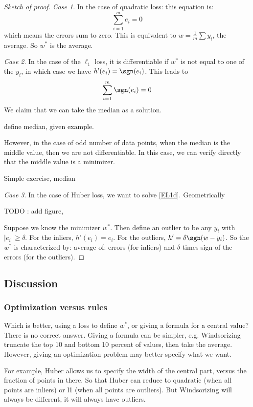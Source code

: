 \documentclass[12pt]{amsart}
\begin{document}
\begin{proof}[Sketch of proof]
\emph{Case 1}. In the case of quadratic loss: this equation is:
\[
\sum_{i=1}^m e_i = 0
\]
which means the errors sum to zero.  This is equivalent to $w = \frac 1 m \sum y_i$, the average.
So $w^*$ is the average. 

\emph{Case 2}. In the case of the $\ell_1$ loss, it is differentiable if $w^*$ is not equal to one of the $y_i$, in which case we have $h'(e_i) = \sgn(e_i)$.   This leads to 
\[
\sum_{i=1}^m \sgn(e_i) = 0
\]
We claim that we can take the median as a solution.   
\begin{TODO}
define median, given example. 	
\end{TODO}
However, in the case of odd number of data points, when the median is the middle value, then we are not differentiable.  In this case, we can verify directly that the middle value is a minimizer. 
\begin{TODO}
Simple exercise, median	
\end{TODO}


\emph{Case 3}. In the case of Huber loss, we want to solve \eqref{EL1d}.   Geometrically 
\begin{TODO}
	TODO : add figure, 
\end{TODO}
Suppose we know the minimizer $w^*$.  Then define an outlier to be any $y_i$ with $|e_i| \geq \delta$. 
For the inliers, $h'(e_i) = e_i$.  For the outliers, $h' =  \delta \sgn(w-y_i)$.   So the $w^*$ is characterized by:
average of: errors (for inliers) and $\delta$ times sign of the errors (for the outliers). 
\end{proof}

\subsection{Discussion}

\subsubsection{Optimization versus rules}
Which is better, using a loss to define $w^*$, or giving a formula for a central value?
There is no correct answer.  Giving a formula can be simpler, e.g. Windsorizing truncate the top 10 and bottom 10 percent of values, then take the average.  However, giving an optimization problem may better specify what we want.  

For example, Huber allows us to specify the width of the central part, versus the fraction of points in there. 
So that Huber can reduce to quadratic (when all points are inliers) or l1 (when all points are outliers).  But Windsorizing will always be different, it will always have outliers.
\end{document}
